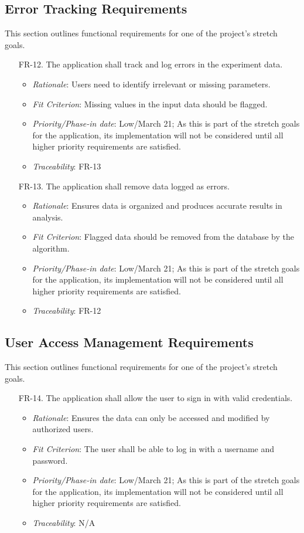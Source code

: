 \documentclass[12pt]{article}
\begin{document}
\subsection{Error Tracking Requirements}
This section outlines functional requirements for one of the project's stretch
goals.
\begin{enumerate}
  \item[FR-12.] The application shall track and log errors in the experiment data.
  \begin{itemize}
    \item \textit{Rationale}: Users need to identify irrelevant or missing parameters.
    \item \textit{Fit Criterion}: Missing values in the input data should be flagged.
    \item \textit{Priority/Phase-in date}: Low/March 21; As this is part of the stretch goals for the application, its implementation will not be considered until all higher priority requirements are satisfied.
    \item \textit{Traceability}: FR-13
  \end{itemize}
  \item[FR-13.] The application shall remove data logged as errors.
  \begin{itemize}
    \item \textit{Rationale}: Ensures data is organized and produces accurate results in analysis.
    \item \textit{Fit Criterion}: Flagged data should be removed from the database by the algorithm.
    \item \textit{Priority/Phase-in date}: Low/March 21; As this is part of the stretch goals for the application, its implementation will not be considered until all higher priority requirements are satisfied.
    \item \textit{Traceability}: FR-12
  \end{itemize}
\end{enumerate}

\subsection{User Access Management Requirements}
This section outlines functional requirements for one of the project's stretch
goals.
\begin{enumerate}
  \item[FR-14.] The application shall allow the user to sign in with valid credentials.
  \begin{itemize}
    \item \textit{Rationale}: Ensures the data can only be accessed and modified by authorized users.
    \item \textit{Fit Criterion}: The user shall be able to log in with a username and password.
    \item \textit{Priority/Phase-in date}: Low/March 21; As this is part of the stretch goals for the application, its implementation will not be considered until all higher priority requirements are satisfied.
    \item \textit{Traceability}: N/A
  \end{itemize}
\end{enumerate}
\end{document}
